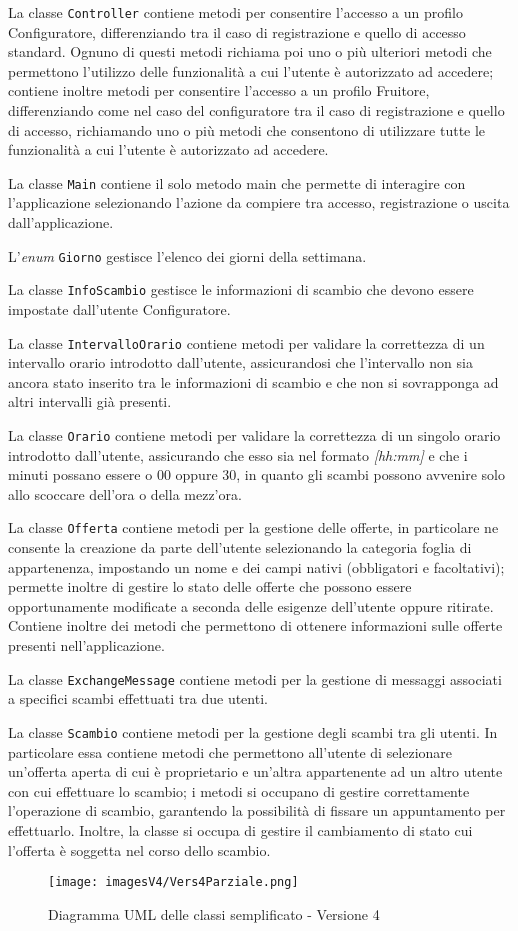La classe \texttt{Controller} contiene metodi per consentire l'accesso a un profilo Configuratore, differenziando tra il caso di registrazione e quello di accesso standard. Ognuno di questi metodi richiama poi uno o più ulteriori metodi che permettono l'utilizzo delle funzionalità a cui l'utente è autorizzato ad accedere; contiene inoltre metodi per consentire l'accesso a un profilo Fruitore, differenziando come nel caso del configuratore tra il caso di registrazione e quello di accesso, richiamando uno o più metodi che consentono di utilizzare tutte le funzionalità a cui l'utente è autorizzato ad accedere.

La classe \texttt{Main} contiene il solo metodo main che permette di interagire con l'applicazione selezionando l'azione da compiere tra accesso, registrazione o uscita dall'applicazione.

L'\textit{enum} \texttt{Giorno} gestisce l'elenco dei giorni della settimana.

La classe \texttt{InfoScambio} gestisce le informazioni di scambio che devono essere impostate dall'utente Configuratore.

La classe \texttt{IntervalloOrario} contiene metodi per validare la correttezza di un intervallo orario introdotto dall'utente, assicurandosi che l'intervallo non sia ancora stato inserito tra le informazioni di scambio e che non si sovrapponga ad altri intervalli già presenti.

La classe \texttt{Orario} contiene metodi per validare la correttezza di un singolo orario introdotto dall'utente, assicurando che esso sia nel formato \textit{[hh:mm]} e che i minuti possano essere o 00 oppure 30, in quanto gli scambi possono avvenire solo allo scoccare dell'ora o della mezz'ora.

La classe \texttt{Offerta} contiene metodi per la gestione delle offerte, in particolare ne consente la creazione da parte dell'utente selezionando la categoria foglia di appartenenza, impostando un nome e dei campi nativi (obbligatori e facoltativi); permette inoltre di gestire lo stato delle offerte che possono essere opportunamente modificate a seconda delle esigenze dell'utente oppure ritirate. Contiene inoltre dei metodi che permettono di ottenere informazioni sulle offerte presenti nell'applicazione.

La classe \texttt{ExchangeMessage} contiene metodi per la gestione di messaggi associati a specifici scambi effettuati tra due utenti.

La classe \texttt{Scambio} contiene metodi per la gestione degli scambi tra gli utenti. In particolare essa contiene metodi che permettono all'utente di selezionare un'offerta aperta di cui è proprietario e un'altra appartenente ad un altro utente con cui effettuare lo scambio; i metodi si occupano di gestire correttamente l'operazione di scambio, garantendo la possibilità di fissare un appuntamento per effettuarlo. Inoltre, la classe si occupa di gestire il cambiamento di stato cui l'offerta è soggetta nel corso dello scambio.

\begin{figure}[bh]
    \centering
    \texttt{[image: imagesV4/Vers4Parziale.png]}
    \caption{\label{fig:Simplified Class Diagram - v4}Diagramma UML delle classi semplificato - Versione 4}
\end{figure}
\bigskip